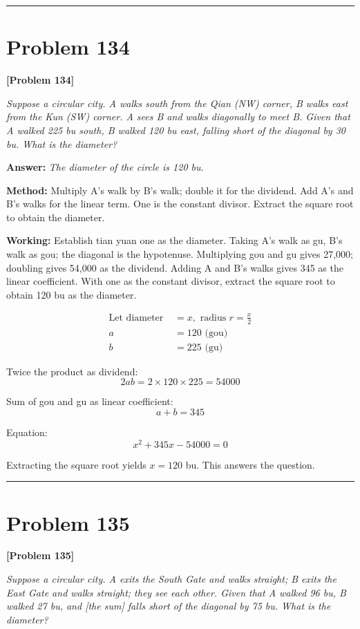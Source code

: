 \documentclass[11pt,a4paper]{book}
\newcommand{\answer}[1]{\noindent\textbf{\color{anacolor}Answer: }\textit{#1}\par}
\newcommand{\method}[1]{\noindent\textbf{\color{methodcolor}Method: }#1\par}
\newcommand{\working}[1]{\noindent\textbf{\color{workcolor}Working: }#1\par}
\newcommand{\shortline}{\noindent\rule{0.5\textwidth}{0.4pt}\par}
\begin{document}
\shortline

\section{Problem 134}
\label{sec:prob134}

\noindent\textbf{\color{probcolor}[Problem 134]}

\textit{Suppose a circular city. A walks south from the Qian (NW) corner, B walks east from the Kun (SW) corner. A sees B and walks diagonally to meet B. Given that A walked 225 bu south, B walked 120 bu east, falling short of the diagonal by 30 bu. What is the diameter?}

\answer{The diameter of the circle is 120 bu.}

\method{Multiply A's walk by B's walk; double it for the dividend. Add A's and B's walks for the linear term. One is the constant divisor. Extract the square root to obtain the diameter.}

\working{Establish tian yuan one as the diameter. Taking A's walk as gu, B's walk as gou; the diagonal is the hypotenuse. Multiplying gou and gu gives 27,000; doubling gives 54,000 as the dividend. Adding A and B's walks gives 345 as the linear coefficient. With one as the constant divisor, extract the square root to obtain 120 bu as the diameter.

\begin{align*}
\text{Let diameter } &= x, \text{ radius } r = \frac{x}{2} \\
a &= 120 \text{ (gou)} \\
b &= 225 \text{ (gu)}
\end{align*}

Twice the product as dividend:
$$2ab = 2 \times 120 \times 225 = 54000$$

Sum of gou and gu as linear coefficient:
$$a + b = 345$$

Equation:
$$x^2 + 345x - 54000 = 0$$

Extracting the square root yields $x = 120$ bu. This answers the question.}

\shortline

\section{Problem 135}
\label{sec:prob135}

\noindent\textbf{\color{probcolor}[Problem 135]}

\textit{Suppose a circular city. A exits the South Gate and walks straight; B exits the East Gate and walks straight; they see each other. Given that A walked 96 bu, B walked 27 bu, and [the sum] falls short of the diagonal by 75 bu. What is the diameter?}
\end{document}
